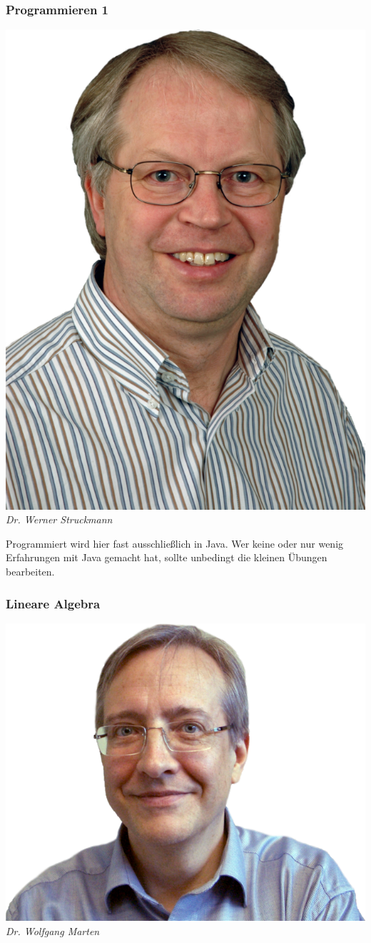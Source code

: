 \begin{multicols}{2}
\subsubsection{Programmieren 1}
	\includegraphics[width=0.6\linewidth]{bilder/dozenten/struck.png}\\
	\textit{Dr. Werner Struckmann}
	
	Programmiert wird hier fast ausschließlich in Java. Wer keine oder nur wenig Erfahrungen mit Java gemacht hat, sollte unbedingt die kleinen Übungen bearbeiten.

\subsubsection{Lineare Algebra}
	\includegraphics[width=0.8\linewidth]{bilder/dozenten/marten_frei.png}\\
	\textit{Dr. Wolfgang Marten}


\end{multicols}

